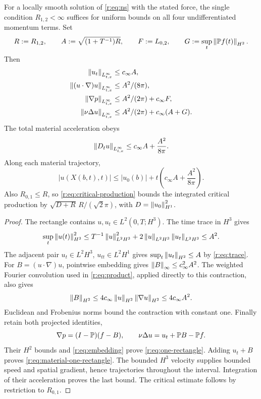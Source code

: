 \begin{corollary}
For a locally smooth solution of \eqref{r:eq:ns} with the stated force,
the single condition \(R_{1,2}<\infty\) suffices for uniform bounds on
all four undifferentiated momentum terms. Set
\[
 R:=R_{1,2},\qquad A:=\sqrt{(1+T^{-1})R},
 \qquad F:=L_{0,2},\qquad
 G:=\sup_t\left\lVert \mathbb P f(t)\right\rVert_{H^2}.
\]
Then
\begin{equation}
 \begin{aligned}
 \left\lVert u_t\right\rVert_{L^\infty_{t,x}}&\le c_\infty A,\\
 \left\lVert (u\cdot\nabla)u\right\rVert_{L^\infty_{t,x}}&\le A^2/(8\pi),\\
 \left\lVert \nabla p\right\rVert_{L^\infty_{t,x}}&\le A^2/(2\pi)+c_\infty F,\\
 \left\lVert \nu\Delta u\right\rVert_{L^\infty_{t,x}}&\le A^2/(2\pi)+c_\infty(A+G).
 \end{aligned}
 \label{r:eq:one-rectangle}
\end{equation}
The total material acceleration obeys
\begin{equation}
 \left\lVert D_tu\right\rVert_{L^\infty_{t,x}}\le c_\infty A+\frac{A^2}{8\pi}.
 \label{r:eq:material-one-rectangle}
\end{equation}
Along each material trajectory,
\[
 |u(X(b,t),t)|
 \le |u_0(b)|+t\left(c_\infty A+\frac{A^2}{8\pi}\right).
\]
Also \(R_{0,1}\le R\), so \eqref{r:eq:critical-production} bounds the
integrated critical production by
\(\sqrt{D+R}\,R/(\sqrt2\pi)\), with \(D=\left\lVert u_0\right\rVert_{H^1}^2\).
\end{corollary}

\begin{proof}
The rectangle contains \(u,u_t\in L^2(0,T;H^3)\). The time trace in
\(H^3\) gives
\[
 \sup_t\left\lVert u(t)\right\rVert_{H^3}^2
 \le T^{-1}\left\lVert u\right\rVert_{L^2H^3}^2
 +2\left\lVert u\right\rVert_{L^2H^3}\left\lVert u_t\right\rVert_{L^2H^3}\le A^2.
\]
The adjacent pair \(u_t\in L^2H^3\), \(u_{tt}\in L^2H^1\)
gives \(\sup_t\left\lVert u_t\right\rVert_{H^2}\le A\) by \eqref{r:eq:trace}.
For \(B=(u\cdot\nabla)u\), pointwise embedding gives
\(\left\lVert B\right\rVert_\infty\le c_\infty^2 A^2\).
The weighted Fourier convolution used in \eqref{r:eq:product}, applied
directly to this contraction, also gives
\[
 \left\lVert B\right\rVert_{H^2}
 \le4c_\infty\left\lVert u\right\rVert_{H^2}\left\lVert \nabla u\right\rVert_{H^2}
 \le4c_\infty A^2.
\]
Euclidean and Frobenius norms bound the contraction with constant one.
Finally retain both projected identities,
\[
 \nabla p=(I-\mathbb P)(f-B),\qquad
 \nu\Delta u=u_t+\mathbb P B-\mathbb P f.
\]
Their \(H^2\) bounds and \eqref{r:eq:embedding} prove
\eqref{r:eq:one-rectangle}. Adding \(u_t+B\) proves
\eqref{r:eq:material-one-rectangle}. The bounded \(H^3\) velocity supplies
bounded speed and spatial gradient, hence trajectories throughout the
interval. Integration of their acceleration proves the last bound.
The critical estimate follows by restriction to \(R_{0,1}\).
\end{proof}

